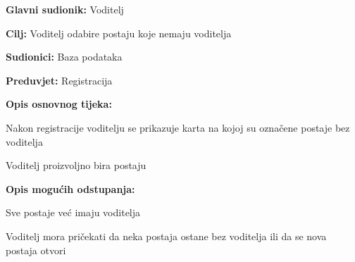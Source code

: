 					\noindent {}
					\begin{packed_item}
						
						\item \textbf{Glavni sudionik: } Voditelj
						\item  \textbf{Cilj:} Voditelj odabire postaju koje nemaju voditelja
						\item  \textbf{Sudionici:} Baza podataka
						\item  \textbf{Preduvjet:} Registracija
						\item  \textbf{Opis osnovnog tijeka:}
						
						\item[] \begin{packed_enum}
							
							\item Nakon registracije voditelju se prikazuje karta na kojoj su označene postaje bez voditelja
							\item Voditelj proizvoljno bira postaju
						\end{packed_enum}
						
						\item  \textbf{Opis mogućih odstupanja:}
						
						\item[] \begin{packed_item}
							
							\item[2.a] Sve postaje već imaju voditelja
							\item[] \begin{packed_enum}
								
								\item Voditelj mora pričekati da neka postaja ostane bez voditelja ili da se nova postaja otvori
								
							\end{packed_enum}
							
						\end{packed_item}
					\end{packed_item}
					
